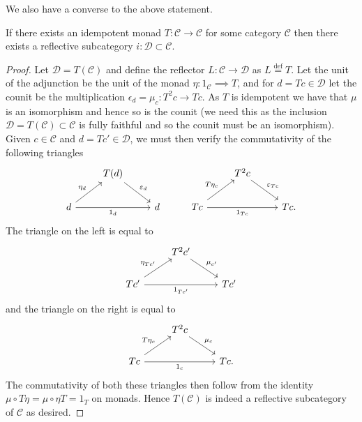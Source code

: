 We also have a converse to the above statement.
\begin{theorem}
  \label{thm:converse}
  If there exists an idempotent monad $ T: \mathcal{C} \to \mathcal{C} $ for some category $ \mathcal{C} $ then there exists a reflective subcategory $ i:\mathcal{D} \subset \mathcal{C} $.
\end{theorem}
\begin{proof}
  Let $ \mathcal{D} = T(\mathcal{C}) $ and define the reflector $ L:\mathcal{C} \to \mathcal{D} $ as $ L \stackrel{\text{def}}{=} T $. Let the unit of the adjunction be the unit of the monad $ \eta: 1_\mathcal{C} \implies T $, and for $ d=Tc \in \mathcal{D} $ let the counit be the multiplication $ \epsilon_d = \mu_c: T^2c \to Tc $. As $ T $ is idempotent we have that $ \mu $ is an isomorphism and hence so is the counit (we need this as the inclusion $ \mathcal{D}=T(\mathcal{C}) \subset \mathcal{C} $ is fully faithful and so the counit must be an isomorphism). Given $ c \in \mathcal{C} $ and $ d=Tc' \in \mathcal{D} $, we must then verify the commutativity of the following triangles
  \[\begin{tikzcd}
	& {T(d)} &&& {T^2c} \\
	  d && d & Tc && Tc.
	  \arrow["{\eta_d}", from=2-1, to=1-2]
	  \arrow["{\varepsilon_d}", from=1-2, to=2-3]
	  \arrow["{1_d}"', from=2-1, to=2-3]
	  \arrow["{1_{Tc}}"', from=2-4, to=2-6]
	  \arrow["{T\eta_c}", from=2-4, to=1-5]
	  \arrow["{\varepsilon_{Tc}}", from=1-5, to=2-6]
  \end{tikzcd}\]
  The triangle on the left is equal to
  \[\begin{tikzcd}
	& {T^2c'} \\
	  Tc' && Tc'
	  \arrow["{\eta_{Tc'}}", from=2-1, to=1-2]
	  \arrow["{\mu_{c'}}", from=1-2, to=2-3]
	  \arrow["{1_{Tc'}}"', from=2-1, to=2-3]
  \end{tikzcd}\]
  and the triangle on the right is equal to
  \[\begin{tikzcd}
	& {T^2c} \\
	  Tc && Tc.
	  \arrow["{T\eta_c}", from=2-1, to=1-2]
	  \arrow["{\mu_c}", from=1-2, to=2-3]
	  \arrow["{1_c}"', from=2-1, to=2-3]
  \end{tikzcd}\]
  The commutativity of both these triangles then follow from the identity
  $ \mu \circ T\eta = \mu \circ \eta T = 1_T $ on monads. Hence $ T(\mathcal{C}) $ is indeed a reflective subcategory of $ \mathcal{C} $ as desired.
\end{proof}
